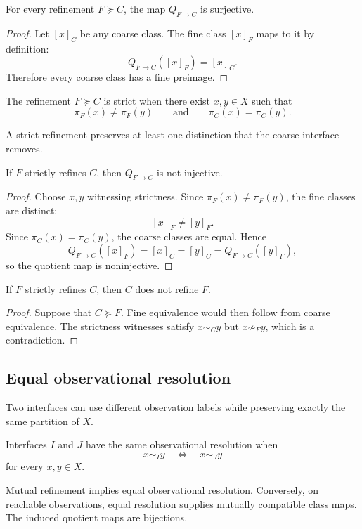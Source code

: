 \begin{theorem}
For every refinement \(F\succeq C\), the map \(Q_{F\to C}\) is surjective.
\end{theorem}

\begin{proof}
Let \([x]_C\) be any coarse class. The fine class \([x]_F\) maps to it by definition:
\[
Q_{F\to C}([x]_F)=[x]_C.
\]
Therefore every coarse class has a fine preimage.
\end{proof}
\begin{definition}
The refinement \(F\succeq C\) is strict when there exist \(x,y\in X\) such that
\[
\pi_F(x)\neq\pi_F(y)
\qquad\text{and}\qquad
\pi_C(x)=\pi_C(y).
\]
\end{definition}
A strict refinement preserves at least one distinction that the coarse interface removes.

\begin{theorem}
If \(F\) strictly refines \(C\), then \(Q_{F\to C}\) is not injective.
\end{theorem}

\begin{proof}
Choose \(x,y\) witnessing strictness. Since \(\pi_F(x)\neq\pi_F(y)\), the fine classes are distinct:
\[
[x]_F\neq[y]_F.
\]
Since \(\pi_C(x)=\pi_C(y)\), the coarse classes are equal. Hence
\[
Q_{F\to C}([x]_F)=[x]_C=[y]_C=Q_{F\to C}([y]_F),
\]
so the quotient map is noninjective.
\end{proof}
\begin{theorem}
If \(F\) strictly refines \(C\), then \(C\) does not refine \(F\).
\end{theorem}

\begin{proof}
Suppose that \(C\succeq F\). Fine equivalence would then follow from coarse equivalence. The strictness witnesses satisfy \(x\sim_C y\) but \(x\not\sim_F y\), which is a contradiction.
\end{proof}
\subsection{Equal observational resolution}

Two interfaces can use different observation labels while preserving exactly the same partition of \(X\).

\begin{definition}
Interfaces \(I\) and \(J\) have the same observational resolution when
\[
x\sim_I y
\quad\Longleftrightarrow\quad
x\sim_J y
\]
for every \(x,y\in X\).
\end{definition}
Mutual refinement implies equal observational resolution. Conversely, on reachable observations, equal resolution supplies mutually compatible class maps. The induced quotient maps are bijections.

